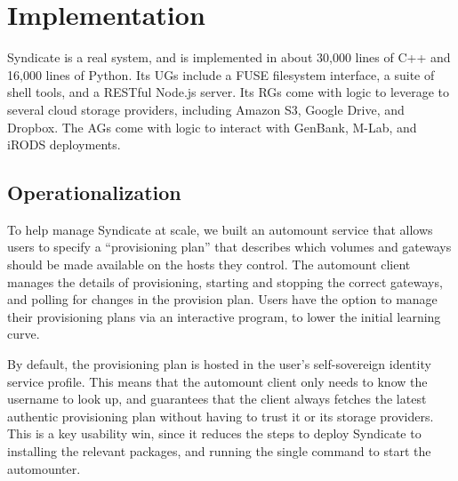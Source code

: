 \section{Implementation}
\label{sec:implementation}

Syndicate is a real system, and is implemented in about 30,000 lines of C++ and
16,000 lines of Python. Its UGs include a FUSE filesystem interface, a suite of
shell tools, and a RESTful Node.js server. Its RGs come with logic to leverage
to several cloud storage providers, including Amazon S3, Google Drive, and
Dropbox. The AGs come with logic to interact with GenBank, M-Lab, and iRODS
deployments.

\subsection{Operationalization}

To help manage Syndicate at scale, we built an automount service that allows
users to specify a ``provisioning plan'' that describes which volumes and
gateways should be made available on the hosts they control. The automount client manages the
details of provisioning, starting and stopping the correct gateways, and polling
for changes in the provision plan.  Users have the option to manage their provisioning plans
via an interactive program, to lower the initial learning curve.

By default, the provisioning plan is hosted in the user's self-sovereign
identity service profile.  This means that the automount client only needs to know
the username to look up, and guarantees that the client always
fetches the latest authentic provisioning plan without having to trust it or its
storage providers.  This is a key usability win, since it reduces the steps to
deploy Syndicate to installing the relevant packages, and running the single
command to start the automounter.
